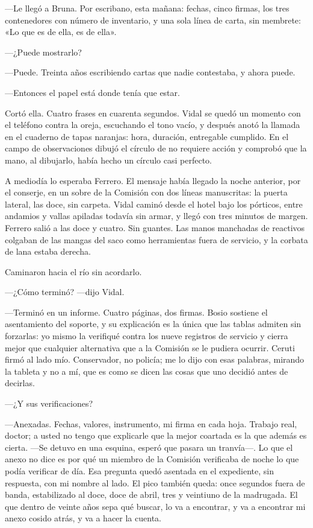 ---Le llegó a Bruna. Por escribano, esta mañana: fechas, cinco firmas, los tres contenedores con número de inventario, y una sola línea de carta, sin membrete: «Lo que es de ella, es de ella».

---¿Puede mostrarlo?

---Puede. Treinta años escribiendo cartas que nadie contestaba, y ahora puede.

---Entonces el papel está donde tenía que estar.

Cortó ella. Cuatro frases en cuarenta segundos. Vidal se quedó un momento con el teléfono contra la oreja, escuchando el tono vacío, y después anotó la llamada en el cuaderno de tapas naranjas: hora, duración, entregable cumplido. En el campo de observaciones dibujó el círculo de no requiere acción y comprobó que la mano, al dibujarlo, había hecho un círculo casi perfecto.

A mediodía lo esperaba Ferrero. El mensaje había llegado la noche anterior, por el conserje, en un sobre de la Comisión con dos líneas manuscritas: la puerta lateral, las doce, sin carpeta. Vidal caminó desde el hotel bajo los pórticos, entre andamios y vallas apiladas todavía sin armar, y llegó con tres minutos de margen. Ferrero salió a las doce y cuatro. Sin guantes. Las manos manchadas de reactivos colgaban de las mangas del saco como herramientas fuera de servicio, y la corbata de lana estaba derecha.

Caminaron hacia el río sin acordarlo.

---¿Cómo terminó? ---dijo Vidal.

---Terminó en un informe. Cuatro páginas, dos firmas. Bosio sostiene el asentamiento del soporte, y su explicación es la única que las tablas admiten sin forzarlas: yo mismo la verifiqué contra los nueve registros de servicio y cierra mejor que cualquier alternativa que a la Comisión se le pudiera ocurrir. Ceruti firmó al lado mío. Conservador, no policía; me lo dijo con esas palabras, mirando la tableta y no a mí, que es como se dicen las cosas que uno decidió antes de decirlas.

---¿Y sus verificaciones?

---Anexadas. Fechas, valores, instrumento, mi firma en cada hoja. Trabajo real, doctor; a usted no tengo que explicarle que la mejor coartada es la que además es cierta. ---Se detuvo en una esquina, esperó que pasara un tranvía---. Lo que el anexo no dice es por qué un miembro de la Comisión verificaba de noche lo que podía verificar de día. Esa pregunta quedó asentada en el expediente, sin respuesta, con mi nombre al lado. El pico también queda: once segundos fuera de banda, estabilizado al doce, doce de abril, tres y veintiuno de la madrugada. El que dentro de veinte años sepa qué buscar, lo va a encontrar, y va a encontrar mi anexo cosido atrás, y va a hacer la cuenta.

